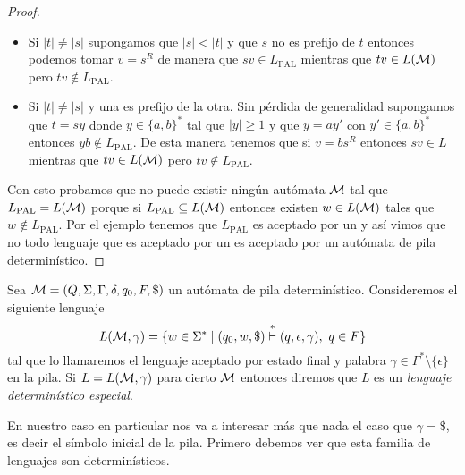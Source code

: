 \documentclass[tesis.tex]{subfiles}
\begin{document}
\begin{proof}
\begin{itemize}
		\item Si $|t|\neq |s|$ supongamos que $|s| < |t|$ y que $s$ no es prefijo de $t$ entonces  podemos tomar $v = s^R$ de manera que $sv \in L_{\text{PAL}}$ mientras que $tv \in L(\cal M)$ pero $tv \notin L_{\text{PAL}}$.
		
		\item Si $|t|\neq |s|$ y una es prefijo de la otra. 
		Sin pérdida de generalidad supongamos que $t=sy$ donde $y \in \{a,b\}^*$ tal que $|y| \ge 1$ y que $y = ay'$ con $y' \in \{a,b\}^*$ entonces $yb \notin L_{\text{PAL}}$.  
		De esta manera tenemos que si $v=bs^R$ entonces $sv \in L$ mientras que $tv \in L(\cal M)$ pero $tv \notin L_{\text{PAL}}$.		
	\end{itemize}
	
	Con esto probamos que no puede existir ningún autómata $\cal M$ tal que $L_{\text{PAL}} = L(\cal M)$ porque si $L_{\text{PAL}} \subseteq L(\cal M)$ entonces existen $w \in L(\cal M)$ tales que $w \notin L_{\text{PAL}}$.
	Por el ejemplo \label{ej_ic_palindromos} tenemos que $L_{\text{PAL}}$ es aceptado por un \APND y así vimos que no todo lenguaje que es aceptado por un \APND es aceptado por un autómata de pila determinístico.
	
\end{proof}

%


\begin{deff}
	Sea ${\cal {M}} = (Q,\Sigma, \Gamma, \delta, q_0, F, \$)$ un autómata de pila determinístico. 
	Consideremos el siguiente lenguaje
	\[
		L({\cal M}, \gamma) = \{ w \in \Sigma^{*} \mid (q_{0},w,\$) \overset{*}{\vdash} (q, \epsilon, \gamma), \ q \in F  \}
	\]
	tal que lo llamaremos el lenguaje aceptado por estado final y palabra $\gamma \in \Gamma^{*} \setminus \{ \epsilon \}$ en la pila.
	Si $L = L({\cal M}, \gamma)$ para cierto $\cal M$ \APD entonces diremos que $L$ es un \emph{lenguaje \ic determinístico especial}. 
\end{deff}

En nuestro caso en particular nos va a interesar más que nada el caso que $\gamma = \$$, es decir el símbolo inicial de la pila.
Primero debemos ver que esta familia de lenguajes son \ic determinísticos.
\end{document}
